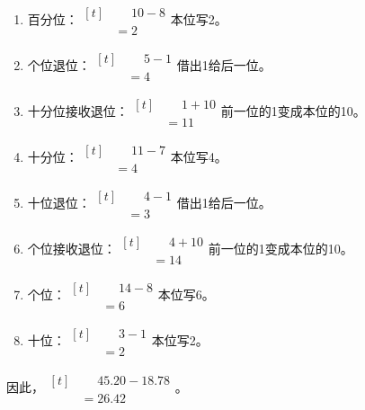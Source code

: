 {\begin{enumerate}[leftmargin=1.7em,itemsep=5pt,topsep=0pt]
\item 百分位：\(\begin{aligned}[t]&\phantom{={}}10-8\\&=2\end{aligned}\)\quad 本位写2。
\item 个位退位：\(\begin{aligned}[t]&\phantom{={}}5-1\\&=4\end{aligned}\)\quad 借出1给后一位。
\item 十分位接收退位：\(\begin{aligned}[t]&\phantom{={}}1+10\\&=11\end{aligned}\)\quad 前一位的1变成本位的10。
\item 十分位：\(\begin{aligned}[t]&\phantom{={}}11-7\\&=4\end{aligned}\)\quad 本位写4。
\item 十位退位：\(\begin{aligned}[t]&\phantom{={}}4-1\\&=3\end{aligned}\)\quad 借出1给后一位。
\item 个位接收退位：\(\begin{aligned}[t]&\phantom{={}}4+10\\&=14\end{aligned}\)\quad 前一位的1变成本位的10。
\item 个位：\(\begin{aligned}[t]&\phantom{={}}14-8\\&=6\end{aligned}\)\quad 本位写6。
\item 十位：\(\begin{aligned}[t]&\phantom{={}}3-1\\&=2\end{aligned}\)\quad 本位写2。
\end{enumerate}
\par\smallskip
因此，\(\begin{aligned}[t]&\phantom{={}}45.20-18.78\\&=26.42\end{aligned}\)。
\par\medskip

}
